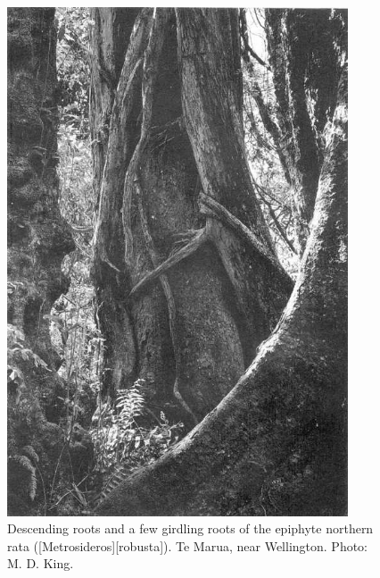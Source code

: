 \begin{figure}[htb]
	\centering
	\begin{minipage}[t]{0.53\textwidth}
		\centering
		\includegraphics[width=0.9\textwidth]{graphics/figure50rata.jpg}
    	\caption[Descending roots and a few girdling roots of the epiphyte northern rata]{Descending roots and a few girdling roots of the epiphyte northern rata ([Metrosideros][robusta]).
        Te Marua, near Wellington.
    	Photo: M. D. King.}%
    	\label{fig:50rata}
	\end{minipage}\hfill%
	\begin{minipage}[t]{0.45\textwidth}
    	\centering

\end{minipage}
\end{figure}

